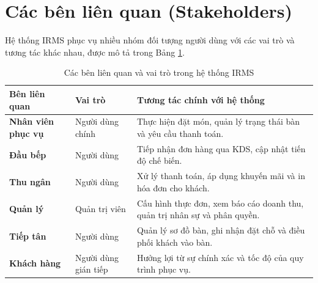 \section{Các bên liên quan (Stakeholders)}

Hệ thống IRMS phục vụ nhiều nhóm đối tượng người dùng với các vai trò và tương tác khác nhau, được mô tả trong Bảng \ref{tab:stakeholders}.

\begin{table}[H]
\centering
\caption{Các bên liên quan và vai trò trong hệ thống IRMS}
\label{tab:stakeholders}
\begin{tabularx}{\textwidth}{|l|l|X|}
\hline
\textbf{Bên liên quan} & \textbf{Vai trò} & \textbf{Tương tác chính với hệ thống} \\ \hline
\textbf{Nhân viên phục vụ} & Người dùng chính & Thực hiện đặt món, quản lý trạng thái bàn và yêu cầu thanh toán. \\ \hline
\textbf{Đầu bếp} & Người dùng & Tiếp nhận đơn hàng qua KDS, cập nhật tiến độ chế biến. \\ \hline
\textbf{Thu ngân} & Người dùng & Xử lý thanh toán, áp dụng khuyến mãi và in hóa đơn cho khách. \\ \hline
\textbf{Quản lý} & Quản trị viên & Cấu hình thực đơn, xem báo cáo doanh thu, quản trị nhân sự và phân quyền. \\ \hline
\textbf{Tiếp tân} & Người dùng & Quản lý sơ đồ bàn, ghi nhận đặt chỗ và điều phối khách vào bàn. \\ \hline
\textbf{Khách hàng} & Người dùng gián tiếp & Hưởng lợi từ sự chính xác và tốc độ của quy trình phục vụ. \\ \hline
\end{tabularx}
\end{table}
